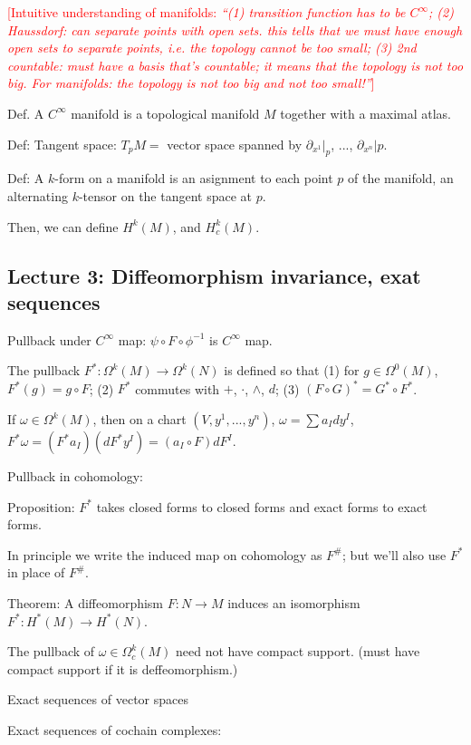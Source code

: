 \documentclass{article}
\theoremstyle{mystyle}
\theoremstyle{remark}
\numberwithin{equation}{section}
\begin{document}
\textcolor{red}{[Intuitive understanding of manifolds: \emph{``(1) transition function has to be $C^\infty$; (2) Haussdorf: can separate points with open sets. this tells that we must have enough open sets to separate points, i.e. the topology cannot be too small; (3) 2nd countable: must have a basis that's countable; it means that the topology is not too big. For manifolds: the topology is not too big and not too small!''}]}

Def. A $C^\infty$ manifold is a topological manifold $M$ together with a maximal atlas.

Def: Tangent space: $T_pM=$ vector space spanned by $\partial_{x^1}|_p$, ..., $\partial_{x^n}|p$. 


Def: A $k$-form on a manifold is an asignment to each point $p$ of the manifold, an alternating $k$-tensor on the tangent space at $p$.

Then, we can define $H^k(M)$, and $H^k_c(M)$. 

\subsection{Lecture 3: Diffeomorphism invariance, exat sequences}

Pullback under $C^\infty$ map: $\psi\circ F\circ \phi^{-1}$ is $C^\infty$ map.

The pullback $F^*\colon \Omega^k(M)\rightarrow \Omega^k(N)$ is defined  so that (1) for $g \in \Omega^0(M)$, $F^*(g) = g\circ F$; (2) $F^*$ commutes with $+$, $\cdot$, $\wedge$, $d$; (3) $(F\circ G)^* = G^*\circ F^*$. 

If $\omega \in \Omega^k(M)$, then on a chart $(V,y^1,...,y^n)$, $\omega = \sum a_I dy^I$, $F^*\omega = (F^*a_I) (d F^* y^I)
=(a_I\circ F) d F^I$. 

Pullback in cohomology: 

Proposition: $F^*$ takes closed forms to closed forms and exact forms to exact forms.

In principle we write the induced map on cohomology as $F^\#$; but we'll also use $F^*$ in place of $F^\#$.

Theorem: A diffeomorphism $F\colon N\rightarrow M$ induces an isomorphism $F^*\colon H^*(M)\rightarrow H^*(N)$. 

The pullback of $\omega \in \Omega^k_c(M)$ need not have compact support. (must have compact support if it is deffeomorphism.)

Exact sequences of vector spaces

Exact sequences of cochain complexes:
\end{document}
